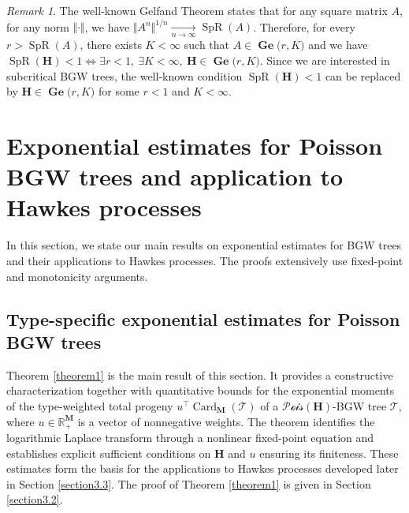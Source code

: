 \documentclass[reqno,final,11pt]{amsart}
\theoremstyle{plain}
\theoremstyle{definition}
\theoremstyle{remark}
\newtheorem{remark}[theorem]{Remark}
\newcommand{\R}{\mathds{R}}
\newcommand{\M}{\bm{M}}
\newcommand{\Ge}[2]{\bm{\Gel(} #1,#2 \bm{)} }
\newcommand{\T}{\mathcal{T}}
\renewcommand{\H}{\bm{H}}
\newcommand{\pos}{\R_+^{\M}}
\newcommand{\Pois}{\mathscr{P}\!\mathscr{o}\!\mathscr{i}\!\mathscr{s}}
\newcommand{\trp}{^{\intercal}}
\DeclareMathOperator{\card}{Card}
\DeclareMathOperator{\spr}{SpR}
\DeclareMathOperator{\Gel}{Ge}
\begin{document}
\begin{remark}
	The well-known Gelfand Theorem states that for any square matrix $A$, for any norm $\Vert \cdot \Vert$, we have $\Vert A^n \Vert ^{1/n} \xrightarrow[n\to\infty]{} \spr(A)$. Therefore, for every $r>\spr(A)$, there exists $K<\infty$ such that $A\in \Ge{r}{K}$ and we have $\spr(\H)<1 \iff \exists  r <1, \ \exists K<\infty, \ \H\in \Ge{r}{K}$. Since we are interested in subcritical BGW trees, the well-known condition $\spr(\H)<1$ can be replaced by $\H\in\Ge{r}{K}$ for some $r<1$ and $K<\infty$.
\end{remark}

\section{Exponential estimates for Poisson BGW trees and application to Hawkes processes}\label{section3}

In this section, we state our main results on exponential estimates for BGW trees and their applications to Hawkes processes. The proofs extensively use fixed-point and monotonicity arguments.

\subsection{Type-specific exponential estimates for Poisson BGW trees}\label{sec3sub1}

Theorem \ref{theorem1} is the main result of this section. It provides a constructive characterization together with quantitative bounds for the exponential moments of the type-weighted total progeny $u\trp \card_{\M}(\T)$ of a $\Pois(\H)$-BGW tree $\T$, where $u\in\pos$ is a vector of nonnegative weights. The theorem identifies the logarithmic Laplace transform through a nonlinear fixed-point equation and establishes explicit sufficient conditions on $\H$ and $u$ ensuring its finiteness. These estimates form the basis for the applications to Hawkes processes developed later in Section \ref{section3.3}. The proof of Theorem \ref{theorem1} is given in Section \ref{section3.2}.
\end{document}
